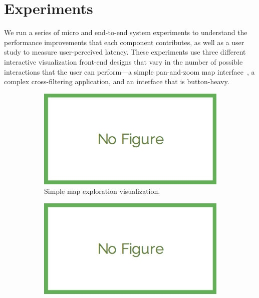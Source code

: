 

\section{Experiments}
\label{sec:experiments}

We run a series of micro and end-to-end system experiments to understand the performance improvements that each component contributes, as well as a user study to measure user-perceived latency.  These experiments use three different interactive visualization front-end designs that vary in the number of possible interactions that the user can perform---a simple pan-and-zoom map interface~\cite{}, a complex cross-filtering application, and an interface that is button-heavy.

\begin{figure}
  \centering
   \begin{subfigure}[t]{.32\textwidth}
    \includegraphics[width = .99\columnwidth]{figures/nofig}
    \caption{Simple map exploration visualization.}
    \label{f:vis_map} 
  \end{subfigure}
  \begin{subfigure}[t]{.32\textwidth}
    \includegraphics[width = .99\columnwidth]{figures/nofig}

\end{subfigure}
\end{figure}
